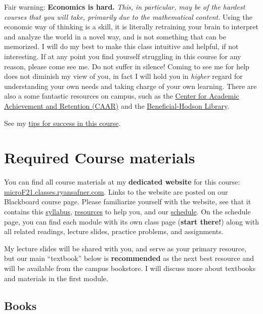 \documentclass{article}
\begin{document}
{Fair warning:} \textbf{Economics is hard.} \emph{This, in particular,
may be of the hardest courses that you will take, primarily due to the
mathematical content.} Using the economic way of thinking is a skill, it
is literally retraining your brain to interpret and analyze the world in
a novel way, and is not something that can be memorized. I will do my
best to make this class intuitive and helpful, if not interesting. If at
any point you find yourself struggling in this course for any reason,
please come see me. Do not suffer in silence! Coming to see me for help
does not diminish my view of you, in fact I will hold you in
\emph{higher} regard for understanding your own needs and taking charge
of your own learning. There are also a some fantastic resources on
campus, such as the
\href{http://www.hood.edu/campus-services/academic-services/index.html}{Center
for Academic Achievement and Retention (CAAR)} and the
\href{http://www.hood.edu/library/}{Beneficial-Hodson Library}.

See my \href{/resources}{tips for success in this course}.

\hypertarget{required-course-materials}{%
\section{Required Course materials}\label{required-course-materials}}

You can find all course materials at my \textbf{dedicated website} for
this course:
\href{https://microF21.classes.ryansafner.com}{microF21.classes.ryansafner.com}.
Links to the website are posted on our Blackboard course page. Please
familiarize yourself with the website, see that it contains this
\href{syllabus/}{syllabus}, \href{resources/}{resources} to help you,
and our \href{schedule/}{schedule}. On the schedule page, you can find
each module with its own class page (\textbf{start there!}) along with
all related readings, lecture slides, practice problems, and
assignments.

My lecture slides will be shared with you, and serve as your primary
resource, but our main ``textbook'' below is \textbf{recommended} as the
next best resource and will be available from the campus bookstore. I
will discuss more about textbooks and materials in the first module.

\hypertarget{books}{%
\subsection{Books}\label{books}}
\end{document}
